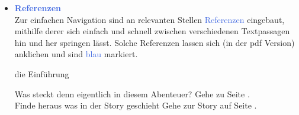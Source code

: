 \begin{itemize}
  \vspace{16pt}
  \begin{centering}
    \noindent{}
  \end{centering}

\newpage

  \item \textcolor{RoyalBlue}{\textbf{Referenzen}} \\
  Zur einfachen Navigation sind an relevanten Stellen \textcolor{RoyalBlue}{Referenzen} eingebaut, mithilfe derer sich einfach und
  schnell zwischen verschiedenen Textpassagen hin und her springen lässt. Solche Referenzen lassen sich (in der pdf
  Version) anklichen und sind \textcolor{RoyalBlue}{blau} markiert.

  \vspace{-5pt}
  \begin{refbox}{die Einführung}

      Was steckt denn eigentlich in diesem Abenteuer? \then Gehe zu Seite . \\
      Finde heraus was in der Story geschieht \then Gehe zur Story auf Seite .
  \end{refbox}
  \vspace{-5pt}

\end{itemize}
